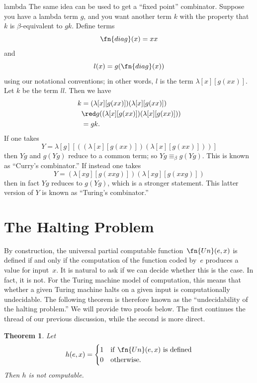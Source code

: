 \documentclass[10pt,a4paper]{article}
\theoremstyle{plain}
\newtheorem{thm}{Theorem}[section]
\theoremstyle{definition}
\theoremstyle{remark}
\newenvironment{digress}{}{}
\newcommand*{\olfileid}[3]{}
\newcommand*{\olsection}[1]{\section*{#1}}
\newcommand*{\ollabel}[1]{\label{#1}}
\providecommand{\lambd}{\ensuremath{\lambda}}
\begin{document}
\begin{tagblock}{lambda}
\begin{digress}
The same idea can be used to get a ``fixed point'' combinator. Suppose
you have a lambda term $g$, and you want another term $k$ with the
property that $k$ is $\beta$-equivalent to $gk$. Define terms
\[
\fn{diag}(x) = xx
\]
and
\[
l(x) = g(\fn{diag}(x))
\]
using our notational conventions; in other words, $l$ is the term
$\lambd[x][g(xx)]$. Let $k$ be the term $ll$. Then we have
\begin{align*}
k & = (\lambd[x][g(xx)])(\lambd[x][g(xx)]) \\
& \red  g((\lambd[x][g(xx)])(\lambd[x][g(xx)])) \\
& = gk.
\end{align*}
If one takes
\[
Y = \lambd[g][((\lambd[x][g(xx)])(\lambd[x][g(xx)]))]
\]
then $Yg$ and $g(Yg)$ reduce to a common term; so $Yg \equiv_\beta
g(Yg)$. This is known as ``Curry's combinator.'' If instead one takes
\[
Y = (\lambd[xg][g(xxg)])(\lambd[xg][g(xxg)])
\]
then in fact $Yg$ reduces to $g(Yg)$, which is a stronger statement.
This latter version of $Y$ is known as ``Turing's combinator.''
\end{digress}
\end{tagblock}





\olfileid{cmp}{thy}{hlt}
\olsection{The Halting Problem}

By construction, the universal partial computable
function~$\fn{Un}(e,x)$ is defined if and only if the computation of
the function coded by~$e$ produces a value for input~$x$. It is
natural to ask if we can decide whether this is the case. In fact, it
is not. For the Turing machine model of computation, this means that
whether a given Turing machine halts on a given input is
computationally undecidable. The following theorem is therefore known
as the ``undecidability of the halting problem.'' We will provide two
proofs below. The first continues the thread of our previous
discussion, while the second is more direct.

\begin{thm}
\ollabel{thm:halting-problem}
Let
\[
h(e, x)  =
\begin{cases}
1 & \text{if\/ $\fn{Un}(e, x)$ is defined} \\
0 & \text{otherwise.}
\end{cases}
\]
Then $h$ is not computable.
\end{thm}
\end{document}
